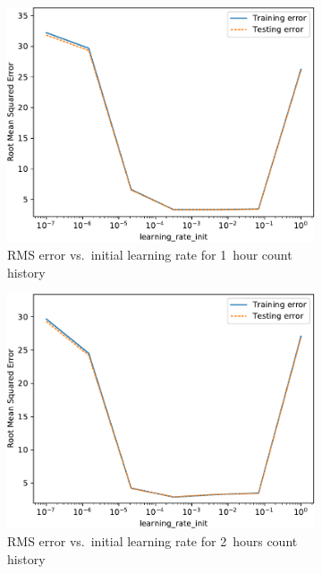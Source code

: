 \clearpage
\begin{figure}[!ht]\centering
    \begin{subfigure}[t]{.47\linewidth}\centering
        \includegraphics[width=0.9\linewidth]{./figures/AplotB1.pdf}
        \caption{RMS error vs.~initial learning rate for 1~hour count history}\label{AppAplotB1}
    \end{subfigure}\hfill%
    \begin{subfigure}[t]{.47\linewidth}\centering
        \includegraphics[width=0.9\linewidth]{./figures/AplotB2.pdf}
        \caption{RMS error vs.~initial learning rate for 2~hours count history}\label{AppAplotB2}
    \end{subfigure}\\[5pt]
    \begin{subfigure}[t]{.47\linewidth}\centering

\end{subfigure}
\end{figure}
